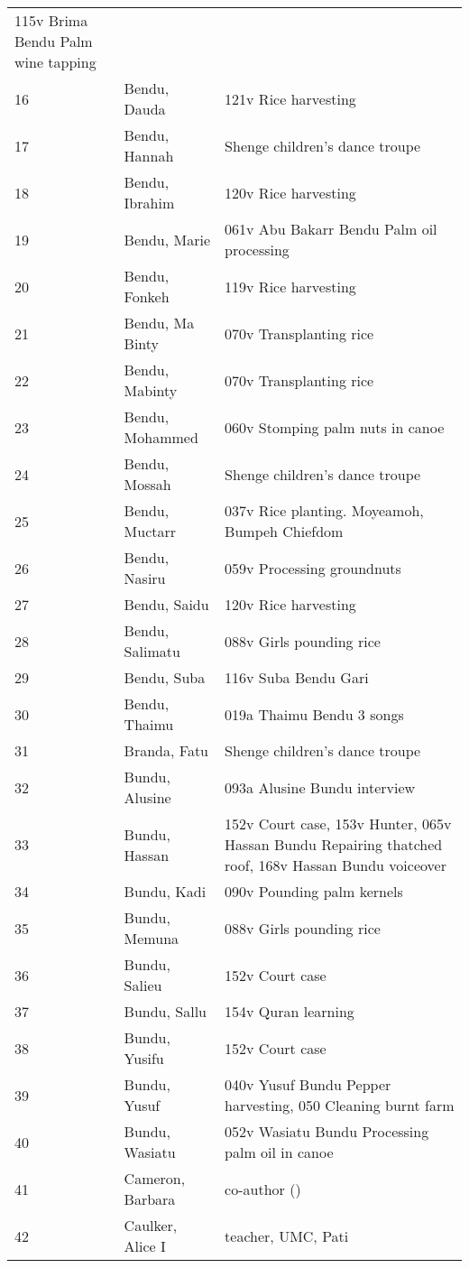 \begin{xltabular}{\textwidth}{llQ}
115v Brima Bendu Palm wine tapping\\
 16 & Bendu, Dauda & 121v Rice harvesting\\
 17 & Bendu, Hannah & Shenge children's dance troupe\\
 18 & Bendu, Ibrahim & 120v Rice harvesting\\
 19 & Bendu, Marie & 061v Abu Bakarr Bendu Palm oil processing\\
 20 & Bendu, Fonkeh & 119v Rice harvesting\\
 21 & Bendu, Ma Binty & 070v Transplanting rice\\
 22 & Bendu, Mabinty & 070v Transplanting rice\\
 23 & Bendu, Mohammed & 060v Stomping palm nuts in canoe\\
 24 & Bendu, Mossah & Shenge children's dance troupe\\
 25 & Bendu, Muctarr & 037v Rice planting. Moyeamoh, Bumpeh Chiefdom\\
 26 & Bendu, Nasiru & 059v Processing groundnuts\\
 27 & Bendu, Saidu & 120v Rice harvesting\\
 28 & Bendu, Salimatu & 088v Girls pounding rice\\
 29 & Bendu, Suba & 116v Suba Bendu Gari\\
 30 & Bendu, Thaimu & 019a Thaimu Bendu 3 songs\\
 31 & Branda, Fatu & Shenge children's dance troupe\\
 32 & Bundu, Alusine & 093a Alusine Bundu interview\\
 33 & Bundu, Hassan & 152v Court case, 153v Hunter, 065v Hassan Bundu Repairing thatched roof, 168v Hassan Bundu voiceover\\
 34 & Bundu, Kadi & 090v Pounding palm kernels\\
 35 & Bundu, Memuna & 088v Girls pounding rice\\
 36 & Bundu, Salieu & 152v Court case\\
 37 & Bundu, Sallu & 154v Quran learning\\
 38 & Bundu, Yusifu & 152v Court case\\
 39 & Bundu, Yusuf & 040v Yusuf Bundu Pepper harvesting, 050 Cleaning burnt farm\\
 40 & Bundu, Wasiatu & 052v Wasiatu Bundu Processing palm oil in canoe\\
 41 & Cameron, Barbara & co-author (\citealt{IversonCameron1986})\\
 42 & Caulker, Alice I & teacher, UMC, Pati\\

\end{xltabular}
